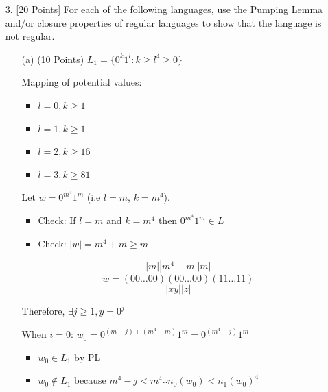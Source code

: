 \documentclass[12pt]{article}
\begin{document}
\begin{spacing}{1.5}
\begin{enumerate}
                  \newpage
            \item[3.] [20 Points] For each of the following languages, use the Pumping Lemma and/or closure properties of regular languages to show that the language is not regular.

                  \begin{enumerate}
                        \item[(a)] (10 Points) $L_1=\{0^k1^l : k \geq l^4 \geq 0\}$

                              Mapping of potential values:
                              \begin{itemize}
                                    \item $l=0, k \geq 1$
                                    \item $l=1, k \geq 1$
                                    \item $l=2, k \geq 16$
                                    \item $l=3, k \geq 81$
                              \end{itemize}

                              Let $w=0^{m^4}1^m$ (i.e $l=m$, $k=m^4$).
                              \begin{itemize}
                                    \item Check: If $l=m$ and $k=m^4$ then $0^{m^4}1^m \in L$
                                    \item Check: $|w|=m^4 + m \geq m$
                              \end{itemize}

                              $$|m||m^4-m||m|$$
                              $$w=(00\dots 00)(00\dots 00)(11\dots 11)$$
                              $$|xy||z|$$

                              Therefore, $\exists j \geq 1, y=0^j$

                              When $i=0$: $w_0=0^{(m-j)+(m^4-m)}1^m = 0^{(m^4-j)}1^m $

                              \begin{itemize}
                                    \item $w_0 \in L_1 \text{ by PL}$
                                    \item $w_0 \not\in L_1 \text{ because } m^4-j < m^4 \therefore n_0(w_0) < n_1(w_0)^4 $
                              \end{itemize}


\end{enumerate}
\end{enumerate}
\end{spacing}
\end{document}
